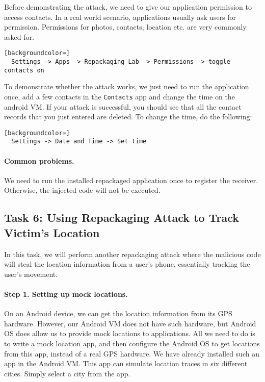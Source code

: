 Before demonstrating the attack, we need to give our application permission to access contacts.
In a real world scenario, applications usually ask users for permission. Permissions for
photos, contacts, location etc. are very commonly asked for.

\begin{lstlisting}[backgroundcolor=]
  Settings -> Apps -> Repackaging Lab -> Permissions -> toggle contacts on
\end{lstlisting}

To demonstrate whether the attack works, we just need to run the application once,
add a few contacts in the \texttt{Contacts} app and change the time on the android VM. If
your attack is successful, you should see that all the contact records that you just entered are
deleted. To change the time, do the following:

\begin{lstlisting}[backgroundcolor=]
  Settings -> Date and Time -> Set time
\end{lstlisting}


\paragraph{Common problems.}
We need to run the installed repackaged application once to register the
receiver. Otherwise, the injected code will not be executed.



\subsection{Task 6: Using Repackaging Attack to Track Victim's Location}


In this task, we will perform another repackaging attack where the
malicious code will steal the location information from a user's phone, 
essentially tracking the user's movement. 


\paragraph{Step 1. Setting up mock locations.}
On an Android device, we can get the location information from
its GPS hardware. However, our Android VM does not have such 
hardware, but Android OS does allow us to 
provide mock locations to applications. All we need to do is to 
write a mock location app, and then configure the Android OS to get
locations from this app, instead of a real GPS hardware. We have already
installed such an app in the Android VM. 
This app can simulate location traces in six different cities. Simply 
select a city from the app. 


